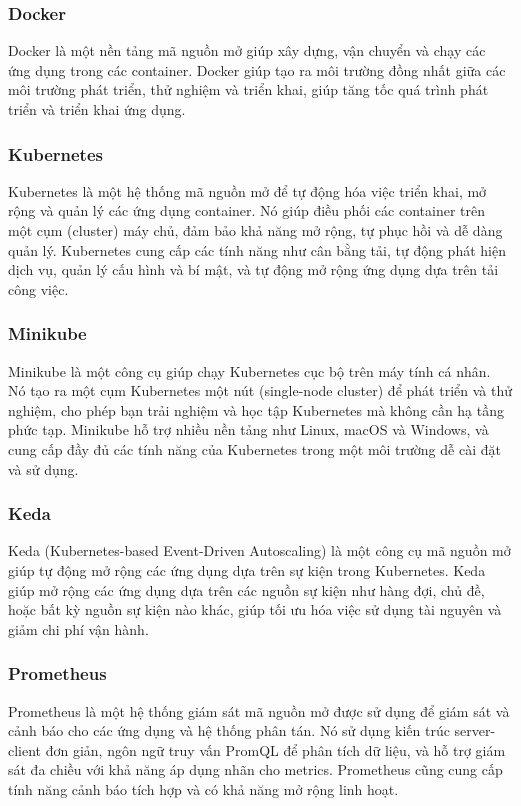 \subsubsection{Docker}
\noindent Docker là một nền tảng mã nguồn mở giúp xây dựng, vận chuyển và chạy các ứng dụng trong các container. Docker giúp tạo ra môi trường đồng nhất giữa các môi trường phát triển, thử nghiệm và triển khai, giúp tăng tốc quá trình phát triển và triển khai ứng dụng.
\subsubsection{Kubernetes}
Kubernetes là một hệ thống mã nguồn mở để tự động hóa việc triển khai, mở rộng và quản lý các ứng dụng container. Nó giúp điều phối các container trên một cụm (cluster) máy chủ, đảm bảo khả năng mở rộng, tự phục hồi và dễ dàng quản lý. Kubernetes cung cấp các tính năng như cân bằng tải, tự động phát hiện dịch vụ, quản lý cấu hình và bí mật, và tự động mở rộng ứng dụng dựa trên tải công việc.
\subsubsection{Minikube}
Minikube là một công cụ giúp chạy Kubernetes cục bộ trên máy tính cá nhân. 
Nó tạo ra một cụm Kubernetes một nút (single-node cluster) để phát triển và thử nghiệm, cho phép bạn trải nghiệm và học tập Kubernetes mà không cần hạ tầng phức tạp. 
Minikube hỗ trợ nhiều nền tảng như Linux, macOS và Windows, và cung cấp đầy đủ các tính năng của Kubernetes trong một môi trường dễ cài đặt và sử dụng.
\subsubsection{Keda}
Keda (Kubernetes-based Event-Driven Autoscaling) là một công cụ mã nguồn mở giúp tự động mở rộng các ứng dụng dựa trên sự kiện trong Kubernetes. 
Keda giúp mở rộng các ứng dụng dựa trên các nguồn sự kiện như hàng đợi, chủ đề, hoặc bất kỳ nguồn sự kiện nào khác, 
giúp tối ưu hóa việc sử dụng tài nguyên và giảm chi phí vận hành.
\subsubsection{Prometheus}
Prometheus là một hệ thống giám sát mã nguồn mở được sử dụng để giám sát và cảnh báo cho các ứng dụng và 
hệ thống phân tán. Nó sử dụng kiến trúc server-client đơn giản, ngôn ngữ truy vấn PromQL để phân tích dữ liệu, 
và hỗ trợ giám sát đa chiều với khả năng áp dụng nhãn cho metrics. Prometheus cũng cung cấp tính năng cảnh báo tích hợp và có khả năng mở rộng linh hoạt.
